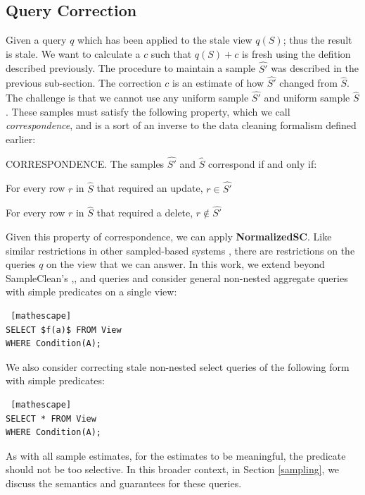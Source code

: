 \subsection{Query Correction}
Given a query $q$ which has been applied to the stale view $q(S)$; thus the result is stale.
We want to calculate a $c$ such that $q(S)+c$ is fresh using the defition described previously.
The procedure to maintain a sample $\hat{S'}$ was described in the previous sub-section.
The correction $c$ is an estimate of how $\hat{S'}$ changed from $\hat{S}$.
The challenge is that we cannot use any uniform sample $\hat{S'}$ and uniform sample $\hat{S}$.
These samples must satisfy the following property, which we call \emph{correspondence}, and is a sort of an inverse to the 
data cleaning formalism defined earlier:

\begin{definition} CORRESPONDENCE.
The samples $\hat{S'}$ and $\hat{S}$ correspond if and only if:
\item For every row $r$ in $\hat{S}$ that required an update, $r\in \hat{S'}$
\item For every row $r$ in $\hat{S}$ that required a delete, $r \not\in \hat{S'}$
\end{definition}

Given this property of correspondence, we can apply \textbf{NormalizedSC}.
Like similar restrictions in other sampled-based systems \cite{agarwalknowing}, there are restrictions on the queries $q$ on the view that we can answer.
In this work, we extend beyond SampleClean's \sumfunc,\countfunc, and \avgfunc queries and consider general non-nested aggregate queries with simple predicates on a single view:
\begin{lstlisting} [mathescape]
SELECT $f(a)$ FROM View 
WHERE Condition(A);
\end{lstlisting}
We also consider correcting stale non-nested select queries of the following form with simple predicates:
\begin{lstlisting} [mathescape]
SELECT * FROM View 
WHERE Condition(A);
\end{lstlisting}
As with all sample estimates, for the estimates to be meaningful, the predicate should not be too selective. 
In this broader context, in Section \ref{sampling}, we discuss the semantics and guarantees for these queries.

